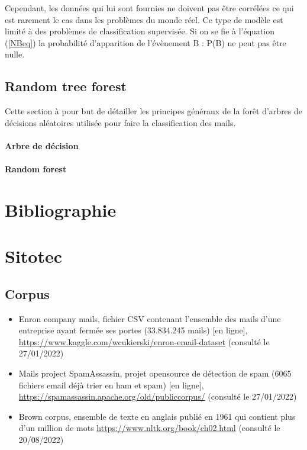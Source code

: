 \documentclass[a4paper,12pt]{article}
\begin{document}
				Cependant, les données qui lui sont fournies ne doivent pas être corrélées ce qui est rarement le cas dans les problèmes du monde réel. Ce type de modèle est limité à des problèmes de classification supervisée. Si on se fie à l'équation (\ref{NBeq}) la probabilité d'apparition de l’évènement B : P(B) ne peut pas être nulle. 
				
				
		\subsection{Random tree forest}
			Cette section à pour but de détailler les principes généraux de la forêt d'arbres de décisions aléatoires utilisée pour faire la classification des mails. 
			
			\paragraph{Arbre de décision}
			
			
			\paragraph{Random forest}
	
	
	
										
	\section{Bibliographie}
		
		
		


		
	\section{Sitotec}
		\subsection{Corpus}
			\begin{itemize}
				\item Enron company mails, fichier CSV contenant l'ensemble des mails d'une entreprise ayant fermée ses portes (33.834.245 mails) [en ligne], \url{https://www.kaggle.com/wcukierski/enron-email-dataset} (consulté le 27/01/2022) \label{Enron_dataset}
				\item Mails project SpamAssassin, projet opensource de détection de spam (6065 fichiers email déjà trier en ham et spam) [en ligne], \url{https://spamassassin.apache.org/old/publiccorpus/} (consulté le 27/01/2022) \label{SpamAssassin_dataset}
				\item Brown corpus, ensemble de texte en anglais publié en 1961 qui contient plus d'un million de mots \url{https://www.nltk.org/book/ch02.html} (consulté le 20/08/2022) \label{Brown_corpus}
			\end{itemize}
		
\end{document}
